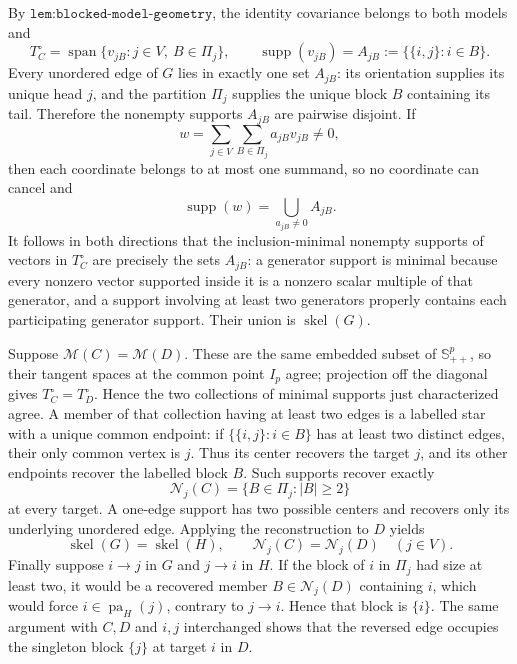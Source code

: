 By \(\texttt{lem:blocked-model-geometry}\), the identity covariance belongs to both models and
\[
 T_C^{\circ}=\operatorname{span}\{v_{jB}:j\in V,\ B\in\Pi_j\},
 \qquad
 \operatorname{supp}(v_{jB})=A_{jB}:=\{\{i,j\}:i\in B\}.
\]
Every unordered edge of \(G\) lies in exactly one set \(A_{jB}\): its orientation supplies its unique head \(j\), and the partition \(\Pi_j\) supplies the unique block \(B\) containing its tail. Therefore the nonempty supports \(A_{jB}\) are pairwise disjoint. If
\[
 w=\sum_{j\in V}\sum_{B\in\Pi_j}a_{jB}v_{jB}\neq0,
\]
then each coordinate belongs to at most one summand, so no coordinate can cancel and
\[
 \operatorname{supp}(w)=\bigcup_{a_{jB}\neq0}A_{jB}.
\]
It follows in both directions that the inclusion-minimal nonempty supports of vectors in \(T_C^{\circ}\) are precisely the sets \(A_{jB}\): a generator support is minimal because every nonzero vector supported inside it is a nonzero scalar multiple of that generator, and a support involving at least two generators properly contains each participating generator support. Their union is \(\operatorname{skel}(G)\).

Suppose \(\mathcal M(C)=\mathcal M(D)\). These are the same embedded subset of \(\mathbb S^p_{++}\), so their tangent spaces at the common point \(I_p\) agree; projection off the diagonal gives \(T_C^{\circ}=T_D^{\circ}\). Hence the two collections of minimal supports just characterized agree. A member of that collection having at least two edges is a labelled star with a unique common endpoint: if \(\{\{i,j\}:i\in B\}\) has at least two distinct edges, their only common vertex is \(j\). Thus its center recovers the target \(j\), and its other endpoints recover the labelled block \(B\). Such supports recover exactly
\[
 \mathcal N_j(C)=\{B\in\Pi_j:|B|\geq2\}
\]
at every target. A one-edge support has two possible centers and recovers only its underlying unordered edge. Applying the reconstruction to \(D\) yields
\[
 \operatorname{skel}(G)=\operatorname{skel}(H),
 \qquad
 \mathcal N_j(C)=\mathcal N_j(D)\quad(j\in V).
\]
Finally suppose \(i\to j\) in \(G\) and \(j\to i\) in \(H\). If the block of \(i\) in \(\Pi_j\) had size at least two, it would be a recovered member \(B\in\mathcal N_j(D)\) containing \(i\), which would force \(i\in\operatorname{pa}_H(j)\), contrary to \(j\to i\). Hence that block is \(\{i\}\). The same argument with \(C,D\) and \(i,j\) interchanged shows that the reversed edge occupies the singleton block \(\{j\}\) at target \(i\) in \(D\).

